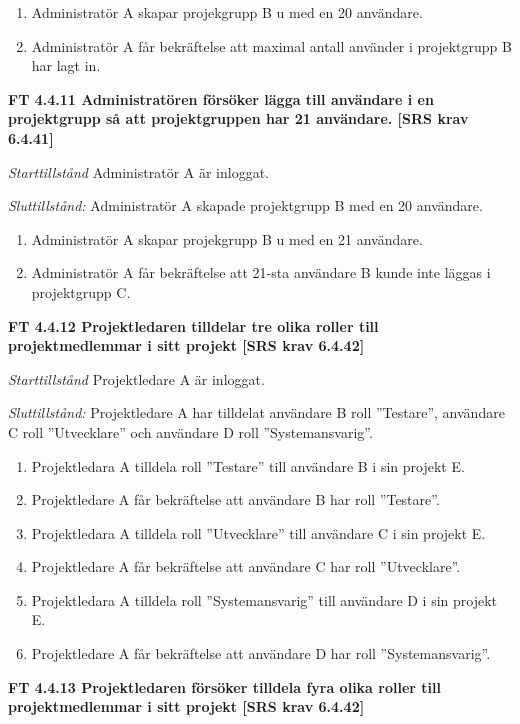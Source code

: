 \documentclass[a4paper]{article}
\begin{document}
\begin{enumerate}
\item Administratör A skapar projekgrupp B u med en 20  användare.
\item Administratör A får bekräftelse att maximal antall använder i projektgrupp B  har lagt in.
\end{enumerate}

\textbf{FT 4.4.11 Administratören försöker lägga till användare i en projektgrupp så att projektgruppen har 21 användare. [SRS krav 6.4.41]}

\emph{Starttillstånd} Administratör A är inloggat.

\emph{Sluttillstånd:} Administratör A  skapade  projektgrupp B med en 20  användare.

\begin{enumerate}
\item Administratör A skapar projekgrupp B u med en 21  användare.
\item Administratör A får bekräftelse att 21-sta användare B kunde inte läggas i projektgrupp C.
\end{enumerate}

\textbf{FT 4.4.12 Projektledaren tilldelar tre olika roller till projektmedlemmar i sitt projekt [SRS krav 6.4.42]}

\emph{Starttillstånd} Projektledare A är inloggat.

\emph{Sluttillstånd:} Projektledare A  har tilldelat användare B roll ”Testare”, användare C roll ”Utvecklare” och användare D roll ”Systemansvarig”.

\begin{enumerate}
\item Projektledara A tilldela roll ”Testare” till användare B i sin projekt E.
\item Projektledare A får bekräftelse att användare B har roll ”Testare”.
\item Projektledara A tilldela roll ”Utvecklare” till användare C i sin projekt E.
\item Projektledare A får bekräftelse att användare C har roll ”Utvecklare”.
\item Projektledara A tilldela roll ”Systemansvarig” till användare D i sin projekt E.
\item Projektledare A får bekräftelse att användare D har roll ”Systemansvarig”.
\end{enumerate}

\textbf{FT 4.4.13 Projektledaren försöker tilldela fyra olika roller till projektmedlemmar i sitt projekt [SRS krav 6.4.42]}
\end{document}
